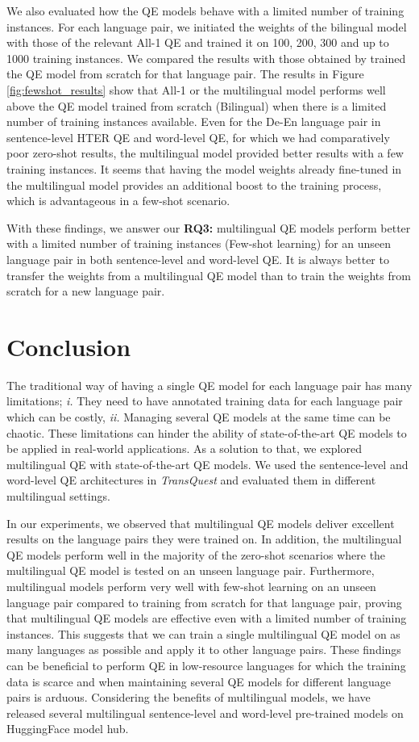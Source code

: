 We also evaluated how the QE models behave with a limited number of training instances. For each language pair, we initiated the weights of the bilingual model with those of the relevant All-1 QE and trained it on 100, 200, 300 and up to 1000 training instances. We compared the results with those obtained by trained the QE model from scratch for that language pair. The results in Figure \ref{fig:fewshot_results} show that All-1 or the multilingual model performs well above the QE model trained from scratch (Bilingual) when there is a limited number of training instances available. Even for the De-En language pair in sentence-level HTER QE and word-level QE, for which we had comparatively poor zero-shot results, the multilingual model provided better results with a few training instances. It seems that having the model weights already fine-tuned in the multilingual model provides an additional boost to the training process, which is advantageous in a few-shot scenario.

With these findings, we answer our \textbf{RQ3:} multilingual QE models perform better with a limited number of training instances (Few-shot learning) for an unseen language pair in both sentence-level and word-level QE. It is always better to transfer the weights from a multilingual QE model than to train the weights from scratch for a new language pair.


\section{Conclusion}
\label{sec:multilingual_conclusion}
The traditional way of having a single QE model for each language pair has many limitations; \textit{i. }They need to have annotated training data for each language pair which can be costly, \textit{ii. }Managing several QE models at the same time can be chaotic.  These limitations can hinder the ability of state-of-the-art QE models to be applied in real-world applications. As a solution to that, we explored multilingual QE with state-of-the-art QE models. We used the sentence-level and word-level QE architectures in \textit{TransQuest} and evaluated them in different multilingual settings. 

In our experiments, we observed that multilingual QE models deliver excellent results on the language pairs they were trained on. In addition, the multilingual QE models perform well in the majority of the zero-shot scenarios where the multilingual QE model is tested on an unseen language pair. Furthermore, multilingual models perform very well with few-shot learning on an unseen language pair compared to training from scratch for that language pair, proving that multilingual QE models are effective even with a limited number of training instances. This suggests that we can train a single multilingual QE model on as many languages as possible and apply it to other language pairs. These findings can be beneficial to perform QE in low-resource languages for which the training data is scarce and when maintaining several QE models for different language pairs is arduous. Considering the benefits of multilingual models, we have released several multilingual sentence-level and word-level pre-trained models on HuggingFace model hub. 

